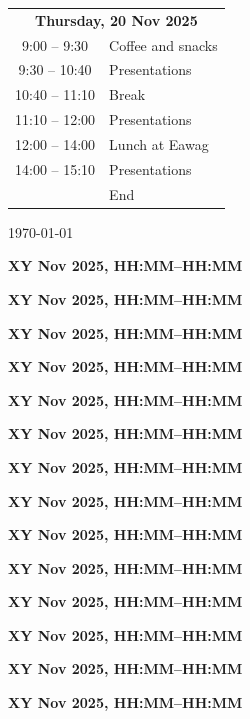 \documentclass[12pt]{extbook}
\renewcommand{\dateseparator}{--}
\newcommand{\abstract}[2]{{
\bigskip
\begin{center}
\large\bfseries #1
\end{center}}
\par

\clearpage
}
\begin{document}
\begin{center}
\begin{tabular}{c@{\hskip 0.5in}l}
\multicolumn{2}{c}{\bf Thursday, 20 Nov 2025}\\[2ex]
\phantom{1}9:00  -- \phantom{1}9:30	  &	Coffee and snacks\\
\phantom{1}9:30  -- 10:40	&	Presentations\\   %
10:40 -- 11:10	&	Break\\
11:10 -- 12:00	& Presentations\\   %
12:00 -- 14:00	&	Lunch at Eawag\\
14:00 -- 15:10	&	Presentations\\   %
                & End

\end{tabular}

\enlargethispage{2cm}
\vfill
\renewcommand{\dateseparator}{--}
{\hfill \tiny \today}

\end{center}

\clearpage







\abstract{XY Nov 2025, HH:MM--HH:MM}{abstracts/Giroud} %
\abstract{XY Nov 2025, HH:MM--HH:MM}{abstracts/Lightfoot} %
\abstract{XY Nov 2025, HH:MM--HH:MM}{abstracts/Selvadurai}

\abstract{XY Nov 2025, HH:MM--HH:MM}{abstracts/Tomonaga} %
\abstract{XY Nov 2025, HH:MM--HH:MM}{abstracts/Marion} %
\abstract{XY Nov 2025, HH:MM--HH:MM}{abstracts/Mace} %

\abstract{XY Nov 2025, HH:MM--HH:MM}{abstracts/Burghardt} %
\abstract{XY Nov 2025, HH:MM--HH:MM}{abstracts/Lefeuvre} %

\abstract{XY Nov 2025, HH:MM--HH:MM}{abstracts/Cateland} %
\abstract{XY Nov 2025, HH:MM--HH:MM}{abstracts/Musy} %

\abstract{XY Nov 2025, HH:MM--HH:MM}{abstracts/Arruda} %
\abstract{XY Nov 2025, HH:MM--HH:MM}{abstracts/Gumindoga} %
\abstract{XY Nov 2025, HH:MM--HH:MM}{abstracts/Welham} %
\abstract{XY Nov 2025, HH:MM--HH:MM}{abstracts/West} %
\end{document}
